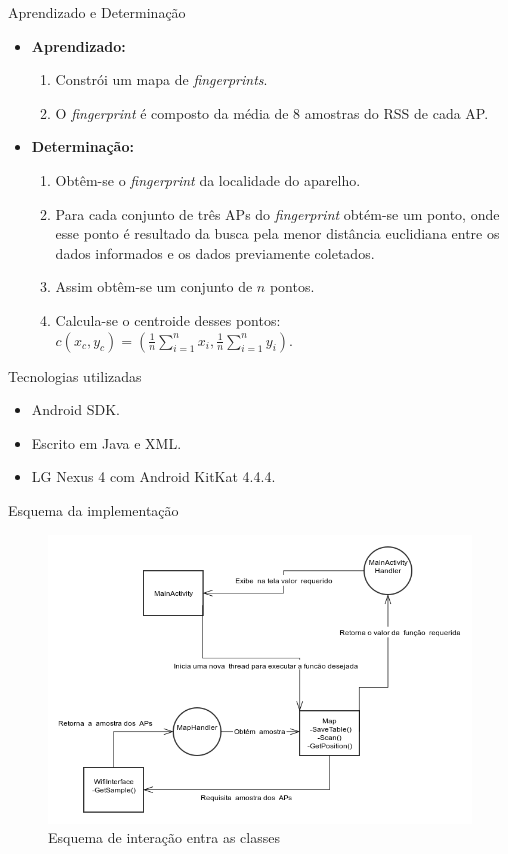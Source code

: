 \documentclass{beamer}
\newlength{\wideitemsep}
\let\olditem\item
\renewcommand{\item}{\setlength{\itemsep}{\wideitemsep}\olditem}
\begin{document}
\begin{frame}{Aprendizado e Determinação}
\begin{itemize}
 \olditem \textbf{Aprendizado:}
  \begin{enumerate}
    \item Constrói um mapa de \textit{fingerprints}.
    \item O \textit{fingerprint} é composto da média de 8 amostras do RSS de cada AP.
  \end{enumerate}
 
 \olditem \textbf{Determinação:}
    \begin{enumerate}

    \item Obtêm-se o \textit{fingerprint} da localidade do aparelho.
    \item Para cada conjunto de três APs do \textit{fingerprint} obtém-se um ponto, onde 
    esse ponto é resultado da busca pela menor distância euclidiana entre os dados informados e os dados
    previamente coletados.
    \item Assim obtêm-se um conjunto de $n$ pontos.
    \item Calcula-se o centroide desses pontos: $c(x_c,y_c) = (\frac{1}{n}\sum_{i=1}^{n}x_{i},\frac{1}{n}\sum_{i=1}^{n}y_{i})$.  
    \end{enumerate}
\end{itemize}
\end{frame}

\begin{frame}{Tecnologias utilizadas}
\begin{itemize}
 \item Android SDK.
 \item Escrito em Java e XML.
 \item LG Nexus 4 com Android KitKat 4.4.4.
\end{itemize}
\end{frame}

\begin{frame}{Esquema da implementação}
  \begin{figure}[hbt]
  \centering
  \includegraphics[scale=0.39]{../images/apptg.png}
  \caption{Esquema de interação entra as classes}
  \label{fig:appSchema}
  \end{figure}
\end{frame}
\end{document}

